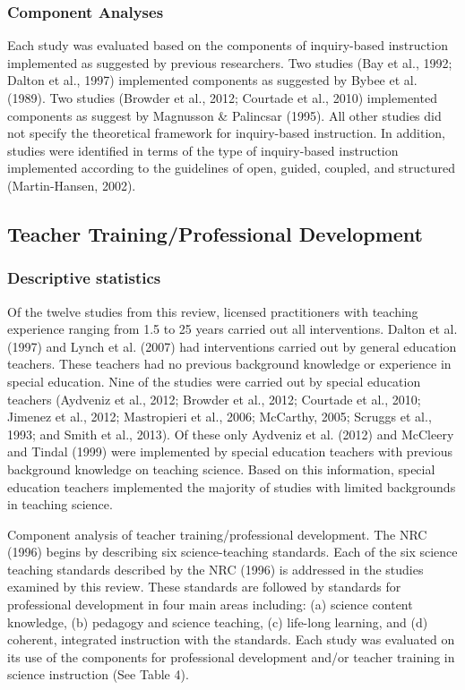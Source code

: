 \documentclass[11.5pt]{sig-alternate} %
\begin{document}
\begin{large}
\subsubsection*{Component Analyses}
Each study was evaluated based on the components of inquiry-based instruction implemented as suggested by previous researchers.  Two studies (Bay et al., 1992; Dalton et al., 1997) implemented components as suggested by Bybee et al. (1989).  Two studies (Browder et al., 2012; Courtade et al., 2010) implemented components as suggest by Magnusson \& Palincsar (1995).  All other studies did not specify the theoretical framework for inquiry-based instruction. In addition, studies were identified in terms of the type of inquiry-based instruction implemented according to the guidelines of open, guided, coupled, and structured (Martin-Hansen, 2002).  

\subsection*{Teacher Training/Professional Development}

\subsubsection*{Descriptive statistics}  
Of the twelve studies from this review, licensed practitioners with teaching experience ranging from 1.5 to 25 years carried out all interventions.  Dalton et al. (1997) and Lynch et al. (2007) had interventions carried out by general education teachers.  These teachers had no previous background knowledge or experience in special education.  Nine of the studies were carried out by special education teachers (Aydveniz et al., 2012; Browder et al., 2012; Courtade et al., 2010; Jimenez et al., 2012; Mastropieri et al., 2006; McCarthy, 2005; Scruggs et al., 1993; and Smith et al., 2013).  Of these only Aydveniz et al. (2012) and McCleery and Tindal (1999) were implemented by special education teachers with previous background knowledge on teaching science. Based on this information, special education teachers implemented the majority of studies with limited backgrounds in teaching science.

Component analysis of teacher training/profes\-sional development.  The NRC (1996) begins by describing six science-teaching standards. Each of the six science teaching standards described by the NRC (1996) is addressed in the studies examined by this review.  These standards are followed by standards for professional development in four main areas including: (a) science content knowledge, (b) pedagogy and science teaching, (c) life-long learning, and (d) coherent, integrated instruction with the standards.  Each study was evaluated on its use of the components for professional development and/or teacher training in science instruction (See Table 4).


\end{large}
\end{document}
